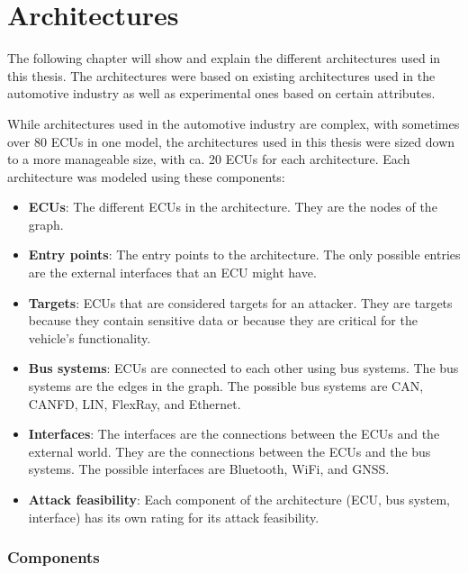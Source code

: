 \chapter{Architectures}
\label{chp:arch}

The following chapter will show and explain the different architectures used in this thesis.
The architectures were based on existing architectures used in the automotive industry as well as experimental ones based on certain attributes.

While architectures used in the automotive industry are complex, with sometimes over 80 ECUs in one model, 
the architectures used in this thesis were sized down to a more manageable size, with ca. 20 ECUs for each architecture.
Each architecture was modeled using these components:

\begin{itemize}

    \item \textbf{ECUs}: The different ECUs in the architecture. They are the nodes of the graph.
    
    \item \textbf{Entry points}: The entry points to the architecture. The only possible entries are the external interfaces that an ECU might have.
    
    \item \textbf{Targets}: ECUs that are considered targets for an attacker. They are targets because they contain sensitive data or because they are critical for the vehicle's functionality.
    
    \item \textbf{Bus systems}: ECUs are connected to each other using bus systems. The bus systems are the edges in the graph. The possible bus systems are CAN, CANFD, LIN, FlexRay, and Ethernet.
    
    \item \textbf{Interfaces}: The interfaces are the connections between the ECUs and the external world. They are the connections between the ECUs and the bus systems. The possible interfaces are Bluetooth, WiFi, and GNSS.
    
    \item \textbf{Attack feasibility}: Each component of the architecture (ECU, bus system, interface) has its own rating for its attack feasibility.

\end{itemize}

\subsection{Components}
\label{sec:components}

